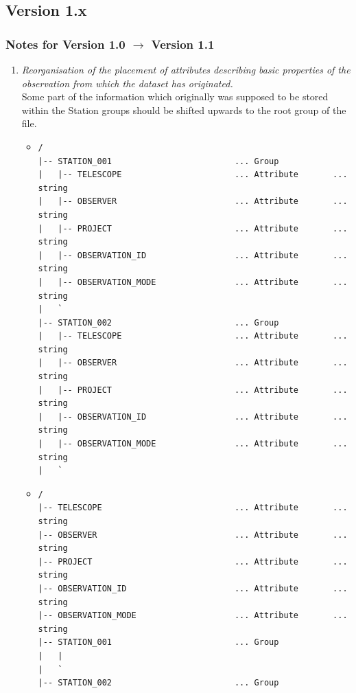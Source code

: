 \documentclass[a4paper,10pt,bibtotoc]{scrartcl}
\begin{document}
\subsection{Version 1.x}

\subsubsection*{Notes for Version 1.0 $\rightarrow$ Version 1.1}

\begin{enumerate}
\item \textit{Reorganisation of the placement of attributes describing
    basic properties of the observation from which the dataset has
    originated.} \\
  Some part of the information which originally was supposed to be stored within
  the Station groups should be shifted upwards to the root group of the file.
  \begin{itemize}
  \item[\underline{old}:]
    {\small
\begin{verbatim}
/
|-- STATION_001                         ... Group
|   |-- TELESCOPE                       ... Attribute       ... string
|   |-- OBSERVER                        ... Attribute       ... string
|   |-- PROJECT                         ... Attribute       ... string
|   |-- OBSERVATION_ID                  ... Attribute       ... string
|   |-- OBSERVATION_MODE                ... Attribute       ... string
|   `
|-- STATION_002                         ... Group
|   |-- TELESCOPE                       ... Attribute       ... string
|   |-- OBSERVER                        ... Attribute       ... string
|   |-- PROJECT                         ... Attribute       ... string
|   |-- OBSERVATION_ID                  ... Attribute       ... string
|   |-- OBSERVATION_MODE                ... Attribute       ... string
|   `
\end{verbatim}}
  \item[\underline{new}:]
    {\small
\begin{verbatim}
/
|-- TELESCOPE                           ... Attribute       ... string
|-- OBSERVER                            ... Attribute       ... string
|-- PROJECT                             ... Attribute       ... string
|-- OBSERVATION_ID                      ... Attribute       ... string
|-- OBSERVATION_MODE                    ... Attribute       ... string
|-- STATION_001                         ... Group
|   |
|   `
|-- STATION_002                         ... Group

\end{verbatim}}
\end{itemize}
\end{enumerate}
\end{document}
